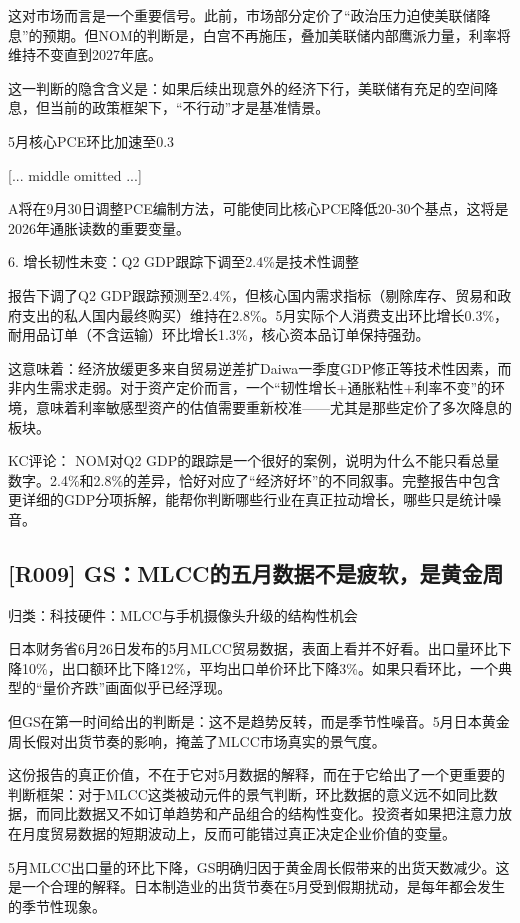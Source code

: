 \documentclass[11pt]{ctexart}
\begin{document}
这对市场而言是一个重要信号。此前，市场部分定价了“政治压力迫使美联储降息”的预期。但NOM的判断是，白宫不再施压，叠加美联储内部鹰派力量，利率将维持不变直到2027年底。

这一判断的隐含含义是：如果后续出现意外的经济下行，美联储有充足的空间降息，但当前的政策框架下，“不行动”才是基准情景。

5月核心PCE环比加速至0.3

[... middle omitted ...]

A将在9月30日调整PCE编制方法，可能使同比核心PCE降低20-30个基点，这将是2026年通胀读数的重要变量。

6. 增长韧性未变：Q2 GDP跟踪下调至2.4\%是技术性调整

报告下调了Q2 GDP跟踪预测至2.4\%，但核心国内需求指标（剔除库存、贸易和政府支出的私人国内最终购买）维持在2.8\%。5月实际个人消费支出环比增长0.3\%，耐用品订单（不含运输）环比增长1.3\%，核心资本品订单保持强劲。

这意味着：经济放缓更多来自贸易逆差扩Daiwa一季度GDP修正等技术性因素，而非内生需求走弱。对于资产定价而言，一个“韧性增长+通胀粘性+利率不变”的环境，意味着利率敏感型资产的估值需要重新校准——尤其是那些定价了多次降息的板块。

KC评论： NOM对Q2 GDP的跟踪是一个很好的案例，说明为什么不能只看总量数字。2.4\%和2.8\%的差异，恰好对应了“经济好坏”的不同叙事。完整报告中包含更详细的GDP分项拆解，能帮你判断哪些行业在真正拉动增长，哪些只是统计噪音。

\subsection{[R009] GS：MLCC的五月数据不是疲软，是黄金周}
{\small\color{refgray}归类：科技硬件：MLCC与手机摄像头升级的结构性机会}

日本财务省6月26日发布的5月MLCC贸易数据，表面上看并不好看。出口量环比下降10\%，出口额环比下降12\%，平均出口单价环比下降3\%。如果只看环比，一个典型的“量价齐跌”画面似乎已经浮现。

但GS在第一时间给出的判断是：这不是趋势反转，而是季节性噪音。5月日本黄金周长假对出货节奏的影响，掩盖了MLCC市场真实的景气度。

这份报告的真正价值，不在于它对5月数据的解释，而在于它给出了一个更重要的判断框架：对于MLCC这类被动元件的景气判断，环比数据的意义远不如同比数据，而同比数据又不如订单趋势和产品组合的结构性变化。投资者如果把注意力放在月度贸易数据的短期波动上，反而可能错过真正决定企业价值的变量。

5月MLCC出口量的环比下降，GS明确归因于黄金周长假带来的出货天数减少。这是一个合理的解释。日本制造业的出货节奏在5月受到假期扰动，是每年都会发生的季节性现象。
\end{document}
